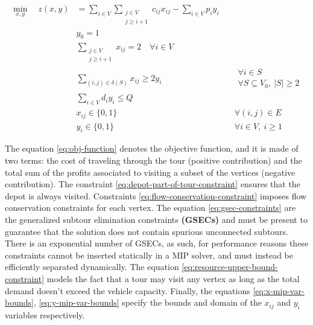 \begin{align}
	\min_{x,y} \quad z(x, y) & =  \sum_{i \in V} \sum_{\substack{j \in V                                                                                \\ j \ge i + 1}} c_{ij} x_{ij} - \sum_{i \in V} p_i y_i \label{eq:obj-function}\\
	                         & y_0 = 1                                           & \label{eq:depot-part-of-tour-constraint}                             \\
	                         & \sum_{\substack{j \in V                                                                                                  \\ j \ge i + 1}}       x_{ij}    = 2 \quad \forall i \in V         \label{eq:flow-conservation-constraint}\\
	                         & \sum_{(i, j) \in \delta(S)} x_{ij} \ge 2 y_{i}    & \quad \substack{\forall i \in S                                      \\ \forall S \subseteq V_0,\ |S| \ge 2} \label{eq:gsec-constraints} \\
	                         & \sum_{i \in V} d_i y_i   \le Q                    & \label{eq:resource-upper-bound-constraint}                           \\
	                         & x_{ij}                   \in \lbrace 0, 1 \rbrace & \quad \forall (i, j) \in E               \label{eq:x-mip-var-bounds} \\
	                         & y_{i}                    \in \lbrace 0, 1 \rbrace & \quad \forall i \in V,\ i \ge 1          \label{eq:y-mip-var-bounds}
\end{align}

The equation \eqref{eq:obj-function} denotes the objective function, and it is made of two terms: the cost of traveling through the tour (positive contribution) and the total sum of the profits associated to visiting a subset of the vertices (negative contribution).
The constraint \eqref{eq:depot-part-of-tour-constraint} ensures that the depot is always visited.
Constraints \eqref{eq:flow-conservation-constraint} imposes flow conservation constraints for each vertex.
The equation \eqref{eq:gsec-constraints} are the generalized subtour elimination constraints \textbf{(GSECs)} and must be present to guarantee that the solution does not contain spurious unconnected subtours.
There is an exponential number of GSECs, as such, for performance reasons these constraints cannot be inserted statically in a MIP solver, and must instead be efficiently separated dynamically.
The equation \eqref{eq:resource-upper-bound-constraint} models the fact that a tour may visit any vertex as long as the total demand doesn't exceed the vehicle capacity.
Finally, the equations \eqref{eq:x-mip-var-bounds}, \eqref{eq:y-mip-var-bounds} specify the bounds and domain of the $x_{ij}$ and $y_{i}$ variables respectively.

